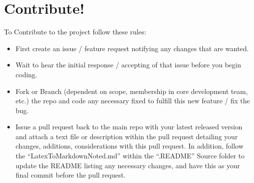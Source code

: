 \documentclass{article}
\begin{document}
\section{Contribute!}
To Contribute to the project follow these rules:
\begin{itemize}
    \item First create an issue / feature request notifying any changes that are wanted.
    \item Wait to hear the initial response / accepting of that issue before you begin coding.
    \item Fork or Branch (dependent on scope, membership in core development team, etc.) the repo and code any necessary fixed to fulfill this new feature / fix the bug.
    \item Issue a pull request back to the main repo with your latest released version and attach a text file or description within the pull request detailing your changes, additions, considerations with this pull request. In addition, follow the ``LatexToMarkdownNoted.md'' within the ``.README'' Source folder to update the README listing any necessary changes, and have this as your final commit before the pull request.
\end{itemize}
\end{document}
